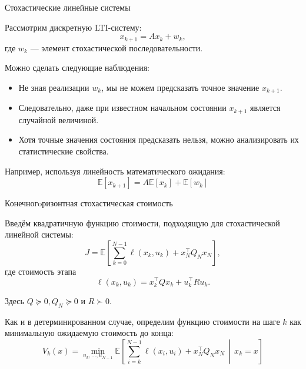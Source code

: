 \documentclass{beamer}
\begin{document}
	\begin{frame}{Стохастические линейные системы}
		\begin{flushleft}
			
			Рассмотрим дискретную LTI-систему:
			\[
			x_{k+1}=Ax_k+w_k,
			\]
			где $w_k$ — элемент стохастической последовательности.
			
			Можно сделать следующие наблюдения:
			
			\begin{itemize}
				\item Не зная реализации $w_k$, мы не можем предсказать
				точное значение $x_{k+1}$.
				
				\item Следовательно, даже при известном начальном состоянии $x_{k+1}$
				является случайной величиной.
				
				\item Хотя точные значения состояния предсказать нельзя, можно
				анализировать их статистические свойства.
			\end{itemize}
			
			\vspace{0.2cm}
			
			Например, используя линейность математического ожидания:
			\[
			\boxed{
				\mathbb{E}[x_{k+1}]
				= A\mathbb{E}[x_k]+\mathbb{E}[w_k]
			}
			\]
			
		\end{flushleft}
	\end{frame}
	
	\begin{frame}{Конечногoризонтная стохастическая стоимость}
		\begin{flushleft}
			
			Введём квадратичную функцию стоимости, подходящую для
			стохастической линейной системы:
			\[
			J = \mathbb{E}\left[
			\sum_{k=0}^{N-1} \ell(x_k,u_k)
			+ x_N^\top Q_N x_N
			\right],
			\]
			где стоимость этапа
			\[
			\ell(x_k,u_k)
			= x_k^\top Q x_k + u_k^\top R u_k.
			\]
			
			Здесь $Q\succeq 0, Q_N\succeq 0$ и $R\succ 0$.
			
			\vspace{0.3cm}
			
			Как и в детерминированном случае, определим функцию стоимости
			на шаге $k$ как минимальную ожидаемую стоимость до конца:
			\[
			\boxed{
				V_k(x) =
				\min_{u_k,\ldots,u_{N-1}}
				\mathbb{E}\left[
				\sum_{i=k}^{N-1}\ell(x_i,u_i)
				+x_N^\top Q_N x_N
				\,\middle|\, x_k=x
				\right]
			}
			\]
			
		\end{flushleft}
	\end{frame}
	
\end{document}
